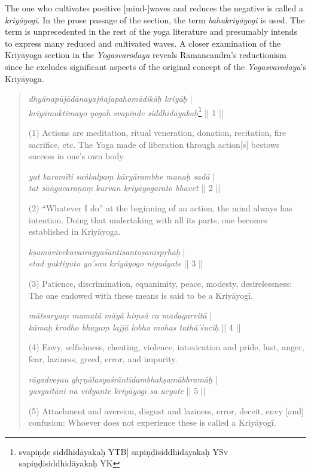 The one who cultivates positive [mind-]waves and reduces the negative is called a \textit{kriyāyogī}. In the prose passage of the section, the term \textit{bahukriyāyogi} is used. The term is unprecedented in the rest of the yoga literature and presumably intends to express many reduced and cultivated waves.
\newpage 
A closer examination of the Kriyāyoga section in the \textit{Yogasvarodaya} reveals Rāmancandra's reductionism since he excludes significant aspects of the original concept of the \textit{Yogasvarodaya}'s Kriyāyoga.


\begin{quote}
\textit{dhyānapūjādānayajñajapahomādikāḥ kriyāḥ} |\\
\textit{kriyāmuktimayo yogaḥ svapiṇḍe siddhidāyakaḥ}\footnote{svapiṇḍe siddhidāyakaḥ YTB] sapiṇḍisiddhidāyakaḥ YSv sapiṇḍisiddhidāyakaḥ YK} || 1 ||

(1) Actions are meditation, ritual veneration, donation, recitation, fire sacrifice, etc. 
The Yoga made of liberation through action[s] bestows success in one's own body. 

\textit{yat karomīti saṅkalpaṃ kāryārambhe manaḥ sadā} |\\
\textit{tat sāṅgācaraṇaṃ kurvan kriyāyogarato bhavet} || 2 ||

(2) ``Whatever I do'' at the beginning of an action, the mind always has intention.  
Doing that undertaking with all its parts, one becomes established in Kriyāyoga. 

\textit{kṣamāvivekavairāgyaśāntisantoṣanispṛhāḥ} |\\
\textit{etad yuktiyuto yo'sau kriyāyogo nigadyate} || 3 ||

(3) Patience, discrimination, equanimity, peace, modesty, desirelessness:
The one endowed with these means is said to be a Kriyāyogī.

\textit{mātsaryaṃ mamatā māyā hiṃsā ca madagarvitā} |\\
\textit{kāmaḥ krodho bhayaṃ lajjā lobho mohas tathā'śuciḥ} || 4 ||

(4) Envy, selfishness, cheating, violence, intoxication and pride,
lust, anger, fear, laziness, greed, error, and impurity.

\textit{rāgadveṣau ghṛṇālasyaśrāntidambhakṣamābhramāḥ} |\\
\textit{yasyaitāni na vidyante kriyāyogī sa ucyate} || 5 ||

(5) Attachment and aversion, disgust and laziness, error, deceit, envy [and] confusion:
Whoever does not experience these is called a Kriyāyogī.


\end{quote}

